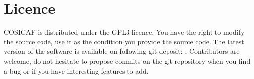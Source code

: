 \documentclass[10pt]{article}
\begin{document}
		
		
	\section{Licence} 
		
	COSICAF is distributed under the GPL3 licence. You have the right to modify the source code, use it as the condition you provide the source code. The latest version of the software is available on following git deposit: . Contributors are welcome, do not hesitate to propose commits on the git repository when you find a bug or if you have interesting features to add.
	
	
\end{document}
